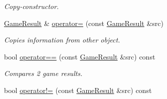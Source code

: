 \begin{DoxyCompactItemize}
\begin{DoxyCompactList}\small\item\em Copy-\/constructor. \item\end{DoxyCompactList}\item 
\hyperlink{classpgn_1_1GameResult}{GameResult} \& \hyperlink{classpgn_1_1GameResult_aec873f6850ce41749fa843663be9a621}{operator=} (const \hyperlink{classpgn_1_1GameResult}{GameResult} \&src)
\begin{DoxyCompactList}\small\item\em Copies information from other object. \item\end{DoxyCompactList}\item 
bool \hyperlink{classpgn_1_1GameResult_a16b63d46d350921fd82b347fd672cf2d}{operator==} (const \hyperlink{classpgn_1_1GameResult}{GameResult} \&src) const 
\begin{DoxyCompactList}\small\item\em Compares 2 game results. \item\end{DoxyCompactList}\item 
\hypertarget{classpgn_1_1GameResult_a59726e2f76eb4f2dac8689c9a8e755dd}{
bool \hyperlink{classpgn_1_1GameResult_a59726e2f76eb4f2dac8689c9a8e755dd}{operator!=} (const \hyperlink{classpgn_1_1GameResult}{GameResult} \&src) const }
\label{classpgn_1_1GameResult_a59726e2f76eb4f2dac8689c9a8e755dd}


\end{DoxyCompactItemize}
